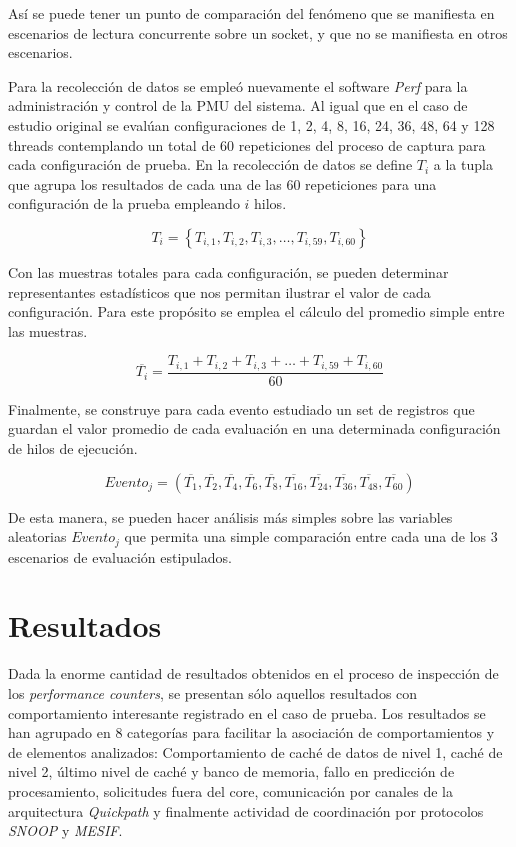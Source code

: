 Así se puede tener un punto de comparación del fenómeno que se manifiesta en escenarios de lectura concurrente sobre un socket, y que no se manifiesta en otros escenarios.

Para la recolección de datos se empleó nuevamente el software \emph{Perf} para la administración y control de la PMU del sistema. Al igual que en el caso de estudio original se evalúan configuraciones de 1, 2, 4, 8, 16, 24, 36, 48, 64 y 128 threads contemplando un total de 60 repeticiones del proceso de captura para cada configuración de prueba. En la recolección de datos se define $T_i$ a la tupla que agrupa los resultados de cada una de las 60 repeticiones para una configuración de la prueba empleando $i$ hilos.

\begin{equation}
\label{eq:tupla1}
T_i = \left\{ T_{i,1},T_{i,2},T_{i,3}, \dots ,T_{i,59}, T_{i,60}\right\} 
\end{equation}

Con las muestras totales para cada configuración, se pueden determinar representantes estadísticos que nos permitan ilustrar el valor de cada configuración. Para este propósito se emplea el cálculo del promedio simple entre las muestras.

\begin{equation}
\label{eq:promedio}
\overline{T_{i}} = \frac{T_{i,1}+T_{i,2}+T_{i,3}+ \dots +T_{i,59}+ T_{i,60}}{60}
\end{equation}

Finalmente, se construye para cada evento estudiado un set de registros que guardan el valor promedio de cada evaluación en una determinada configuración de hilos de ejecución.

\begin{equation}
\label{eq:tupla2}
Evento_j = \left(\overline{T_{1}}, \overline{T_{2}}, \overline{T_{4}}, \overline{T_{6}}, \overline{T_{8}}, \overline{T_{16}}, \overline{T_{24}}, \overline{T_{36}}, \overline{T_{48}}, \overline{T_{60}}\right)
\end{equation}

De esta manera, se pueden hacer análisis más simples sobre las variables aleatorias $Evento_j$ que permita una simple comparación entre cada una de los 3 escenarios de evaluación estipulados.

\section{Resultados}
Dada la enorme cantidad de resultados obtenidos en el proceso de inspección de los \emph{performance counters}, se presentan sólo aquellos resultados con comportamiento interesante registrado en el caso de prueba. Los resultados se han agrupado en 8 categorías para facilitar la asociación de comportamientos y de elementos analizados: Comportamiento de caché de datos de nivel 1, caché de nivel 2, último nivel de caché y banco de memoria, fallo en predicción de procesamiento, solicitudes fuera del core, comunicación por canales de la arquitectura \emph{Quickpath} y finalmente actividad de coordinación por protocolos \emph{SNOOP} y \emph{MESIF}.

